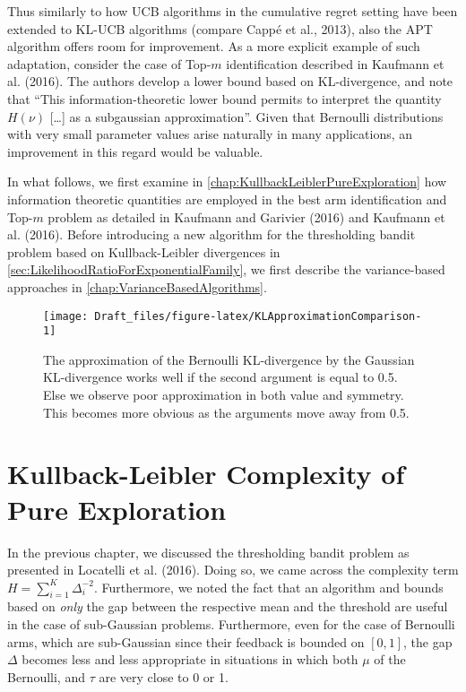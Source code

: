 \documentclass[12pt,]{article}
\begin{document}
Thus similarly to how UCB algorithms in the cumulative regret setting
have been extended to KL-UCB algorithms (compare Cappé et al., 2013),
also the APT algorithm offers room for improvement. As a more explicit
example of such adaptation, consider the case of Top-\(m\)
identification described in Kaufmann et al. (2016). The authors develop
a lower bound based on KL-divergence, and note that ``This
information-theoretic lower bound permits to interpret the quantity
\(H(\nu)\) {[}\ldots{}{]} as a subgaussian approximation''. Given that
Bernoulli distributions with very small parameter values arise naturally
in many applications, an improvement in this regard would be valuable.

In what follows, we first examine in
\autoref{chap:KullbackLeiblerPureExploration} how information theoretic
quantities are employed in the best arm identification and Top-\(m\)
problem as detailed in Kaufmann and Garivier (2016) and Kaufmann et al.
(2016). Before introducing a new algorithm for the thresholding bandit
problem based on Kullback-Leibler divergences in
\autoref{sec:LikelihoodRatioForExponentialFamily}, we first describe the
variance-based approaches in \autoref{chap:VarianceBasedAlgorithms}.

\begin{figure}

{\centering \texttt{[image: Draft\_files/figure-latex/KLApproximationComparison-1]} 

}

\caption{The approximation of the Bernoulli KL-divergence by the Gaussian KL-divergence works well if the second argument is equal to 0.5. Else we observe poor approximation in both value and symmetry. This becomes more obvious as the arguments move away from 0.5.}\label{fig:KLApproximationComparison}
\end{figure}

\section{\texorpdfstring{Kullback-Leibler Complexity of Pure Exploration
\label{chap:KullbackLeiblerPureExploration}}{Kullback-Leibler Complexity of Pure Exploration }}\label{kullback-leibler-complexity-of-pure-exploration}

In the previous chapter, we discussed the thresholding bandit problem as
presented in Locatelli et al. (2016). Doing so, we came across the
complexity term \(H = \sum_{i=1}^{K} \Delta_i^{-2}\). Furthermore, we
noted the fact that an algorithm and bounds based on \emph{only} the gap
between the respective mean and the threshold are useful in the case of
sub-Gaussian problems. Furthermore, even for the case of Bernoulli arms,
which are sub-Gaussian since their feedback is bounded on \([0,1]\), the
gap \(\Delta\) becomes less and less appropriate in situations in which
both \(\mu\) of the Bernoulli, and \(\tau\) are very close to 0 or 1.
\end{document}
